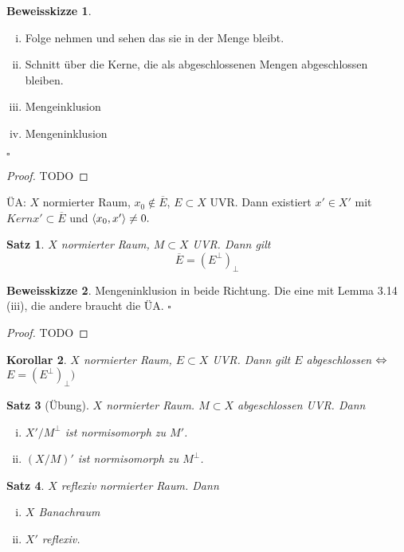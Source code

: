 \documentclass[ngerman]{report}
\theoremstyle{plain}%
\newtheorem{thm}{Satz}[chapter]
\newtheorem{cor}[thm]{Korollar}
\theoremstyle{definition}%
\theoremstyle{myStyle}
\newtheorem*{proof*}{Beweisskizze}
\newenvironment{hinweise}{
			\footnotesize \begin{proof*}}{\hfill $\square$ \end{proof*}\normalsize
			}
\begin{document}
	\begin{hinweise}
			\begin{enumerate}[(i)]
				\item Folge nehmen und sehen das sie in der Menge bleibt.
				\item Schnitt über die Kerne, die als abgeschlossenen Mengen abgeschlossen bleiben.
				\item Mengeinklusion
				\item Mengeninklusion
			\end{enumerate}
	\end{hinweise}

	\begin{proof}
		TODO
	\end{proof}

	ÜA: $X$ normierter Raum, $x_0 \not\in \overline{E}$, $E\subset X$ UVR. Dann existiert $x' \in X'$ mit  $Kern x' \subset \overline{E}$ und $\left \langle x_0, x' \right \rangle \neq 0.$

	\begin{thm} $X$ normierter Raum, $M \subset X$ UVR. Dann gilt 
		$$\overline{E} = (E^\perp)_\perp $$
	\end{thm}

	\begin{hinweise}
		Mengeninklusion in beide Richtung. Die eine mit Lemma 3.14 (iii), die andere braucht die ÜA. 
	\end{hinweise}

	\begin{proof}
		TODO
	\end{proof}

	\begin{cor} 
		$X$ normierter Raum, $E\subset X$ UVR. Dann gilt $E$ abgeschlossen $\overset{}{\Leftrightarrow}$	$ E = (E^\perp)_\perp)$
	\end{cor}

	\begin{thm}[Übung]
		$X$ normierter Raum. $M \subset X$ abgeschlossen UVR. Dann 
					\begin{enumerate}[(i)]
						\item $X' / M^\perp$ ist normisomorph zu $M'$.
						\item $(X / M)'$ ist normisomorph zu $M^\perp$.
					\end{enumerate}
	\end{thm}

	\begin{thm}
		$X$ reflexiv normierter Raum. Dann
					\begin{enumerate}[(i)]
						\item $X$ Banachraum
						\item $X'$ reflexiv.
					\end{enumerate}

	\end{thm}
\end{document}
